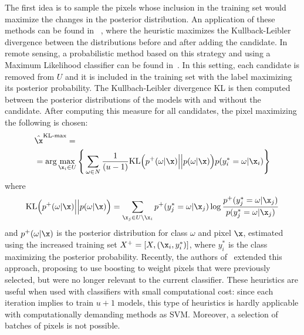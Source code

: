 The first idea is to sample the pixels whose inclusion in the training set would maximize the changes in the posterior distribution. An application of these methods can be found in ~, where the heuristic maximizes the Kullback-Leibler divergence between the distributions before and after adding the candidate. In remote sensing, a probabilistic method based on this strategy and using a Maximum Likelihood classifier can be found in~. In this setting, each candidate is removed from $U$ and it is included in the training set with the label maximizing its posterior probability. The Kullbach-Leibler divergence KL is then computed between the posterior distributions of the models with and without the candidate. After computing this measure for all candidates, the pixel maximizing the following is chosen:
{\small
\begin{align}
&\hat{\x}^{\text{KL-max}} =   \\\nonumber &= \arg \max_{\x_i \in U } \Bigg\{\sum_{\omega \in N} \frac{1}{(u-1)}  \text{KL}\Big(p^+(\omega|\x)\Big\vert\Big\vert p(\omega|\x)\Big)p(y^*_i = \omega|\x_i)\Bigg\}\label{eq:Kmax}
\end{align} }
where
{\small
\begin{align}
 \text{KL}\Big(p^+( \omega|\x)\Big\vert\Big\vert p( \omega|\x)\Big) = \sum_{\x_j \in U \setminus \x_i} p^+(y^*_j = \omega|\x_j)\log\frac{p^+(y^*_j = \omega|\x_j)}{p(y^*_j = \omega|\x_j)}
\end{align} }
and $p^+(\omega|\x)$ is the posterior distribution for class $\omega$ and pixel $\x$, estimated using the increased training set $X^+ = [X,(\x_i,y^*_i)]$, where $y_i^*$ is the class maximizing the posterior probability. Recently, the authors of~ extended this approach, proposing to use boosting to weight pixels that were previously selected, but were no longer relevant to the current classifier. These heuristics are useful when used with classifiers with small computational cost: since each iteration implies to train $u+1$ models, this type of heuristics is hardly applicable with computationally demanding methods as SVM. Moreover, a selection of batches of pixels is not possible.

